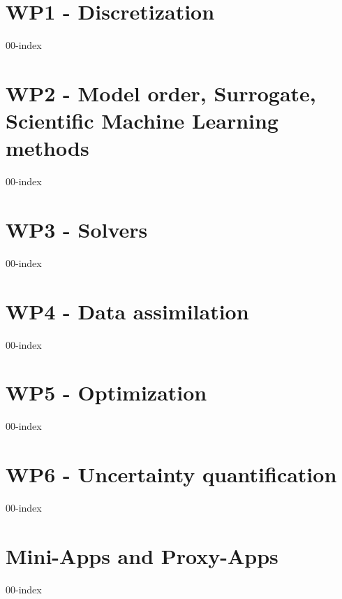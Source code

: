 \chapter{WP1 - Discretization}
\clearpage
{00-index}

\chapter{WP2 - Model order, Surrogate, Scientific Machine Learning methods}
\clearpage
{00-index}

\chapter{WP3 - Solvers}
\clearpage
{00-index}

\chapter{WP4 - Data assimilation}
\clearpage
{00-index}

\chapter{WP5 - Optimization}
\clearpage
{00-index}

\chapter{WP6 - Uncertainty quantification}
\clearpage
{00-index}

\chapter{Mini-Apps and Proxy-Apps}
\clearpage
{00-index}

